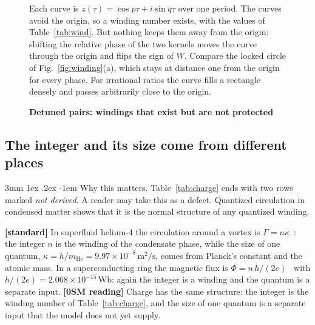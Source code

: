 \documentclass[%
 reprint, amsmath,amssymb, aps, prb, ]{revtex4-2}
\makeatletter
\numberwithin{equation}{section}
\renewcommand\paragraph{%
  \@startsection{paragraph}{4}{\z@}%
    {3mm \@plus 1ex \@minus .2ex}
    {-1em}
    {\normalfont\normalsize\itshape}}
\makeatother
\begin{document}
\begin{figure}[t!]
\centering
{}
\caption{\textbf{Detuned pairs: windings that exist but are not protected}}
\label{fig:liss}
\vspace{0.4em}
\begin{minipage}{0.95\textwidth}
\justifying\small
Each curve is $z(\tau)=\cos p\tau+i\sin q\tau$ over one period. The curves avoid the origin, so a winding number exists, with the values of Table~\ref{tab:wind}. But nothing keeps them away from the origin: shifting the relative phase of the two kernels moves the curve through the origin and flips the sign of $W$. Compare the locked circle of Fig.~\ref{fig:winding}(a), which stays at distance one from the origin for every phase. For irrational ratios the curve fills a rectangle densely and passes arbitrarily close to the origin.
\end{minipage}
\end{figure}

\subsection{The integer and its size come from different places}

\paragraph{Why this matters.} Table~\ref{tab:charge} ends with two rows marked \emph{not derived}. A reader may take this as a defect. Quantized circulation in condensed matter shows that it is the normal structure of any quantized winding.

\textbf{[standard]} In superfluid helium-4 the circulation around a vortex is $\Gamma=n\kappa$~\cite{ref:onsager,ref:feynman55,ref:vinen}: the integer $n$ is the winding of the condensate phase, while the size of one quantum, $\kappa=h/m_{\mathrm{He}}=9.97\times10^{-8}\,\mathrm{m^2/s}$, comes from Planck's constant and the atomic mass. In a superconducting ring the magnetic flux is $\Phi=n\,h/(2e)$~\cite{ref:deaver,ref:doll} with $h/(2e)=2.068\times10^{-15}\,\mathrm{Wb}$: again the integer is a winding and the quantum is a separate input. \textbf{[0SM reading]} Charge has the same structure: the integer is the winding number of Table~\ref{tab:charge}, and the size of one quantum is a separate input that the model does not yet supply.
\end{document}
